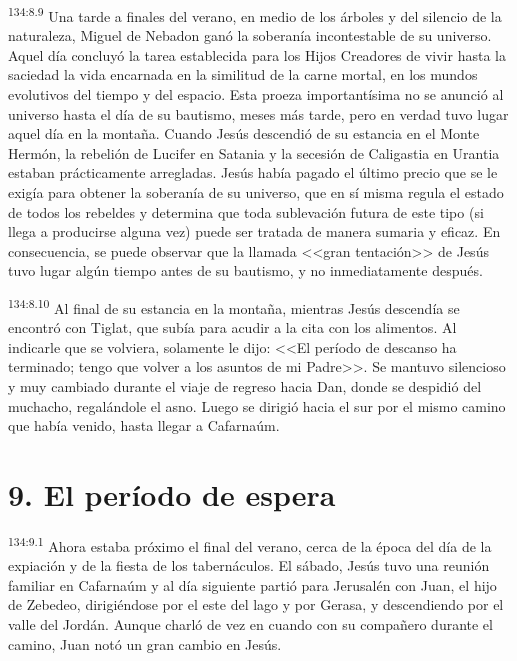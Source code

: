 \par 
\textsuperscript{134:8.9} Una tarde a finales del verano, en medio de los árboles y del silencio de la naturaleza, Miguel de Nebadon ganó la soberanía incontestable de su universo. Aquel día concluyó la tarea establecida para los Hijos Creadores de vivir hasta la saciedad la vida encarnada en la similitud de la carne mortal, en los mundos evolutivos del tiempo y del espacio. Esta proeza importantísima no se anunció al universo hasta el día de su bautismo, meses más tarde, pero en verdad tuvo lugar aquel día en la montaña. Cuando Jesús descendió de su estancia en el Monte Hermón, la rebelión de Lucifer en Satania y la secesión de Caligastia en Urantia estaban prácticamente arregladas. Jesús había pagado el último precio que se le exigía para obtener la soberanía de su universo, que en sí misma regula el estado de todos los rebeldes y determina que toda sublevación futura de este tipo (si llega a producirse alguna vez) puede ser tratada de manera sumaria y eficaz. En consecuencia, se puede observar que la llamada <<gran tentación>> de Jesús tuvo lugar algún tiempo antes de su bautismo, y no inmediatamente después.

\par 
\textsuperscript{134:8.10} Al final de su estancia en la montaña, mientras Jesús descendía se encontró con Tiglat, que subía para acudir a la cita con los alimentos. Al indicarle que se volviera, solamente le dijo: <<El período de descanso ha terminado; tengo que volver a los asuntos de mi Padre>>. Se mantuvo silencioso y muy cambiado durante el viaje de regreso hacia Dan, donde se despidió del muchacho, regalándole el asno. Luego se dirigió hacia el sur por el mismo camino que había venido, hasta llegar a Cafarnaúm.

\section*{9. El período de espera}
\par 
\textsuperscript{134:9.1} Ahora estaba próximo el final del verano, cerca de la época del día de la expiación y de la fiesta de los tabernáculos. El sábado, Jesús tuvo una reunión familiar en Cafarnaúm y al día siguiente partió para Jerusalén con Juan, el hijo de Zebedeo, dirigiéndose por el este del lago y por Gerasa, y descendiendo por el valle del Jordán. Aunque charló de vez en cuando con su compañero durante el camino, Juan notó un gran cambio en Jesús.

